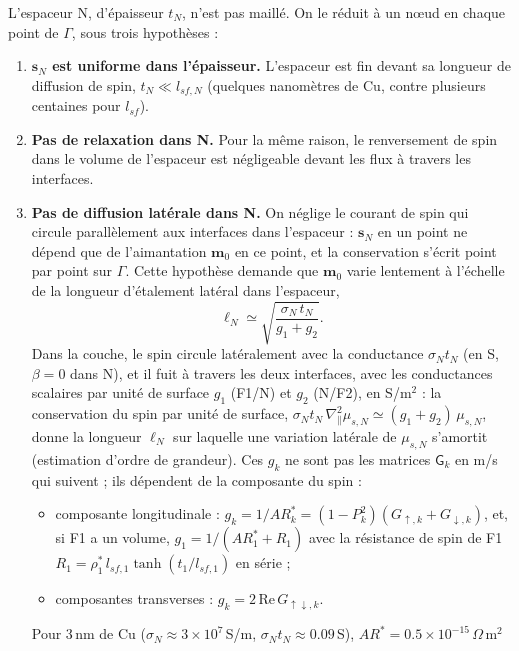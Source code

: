 \documentclass[11pt,a4paper]{article}
\newcommand{\vm}{\bm{m}}
\newcommand{\vs}{\bm{s}}
\newcommand{\mG}{\mathsf{G}}
\begin{document}
L'espaceur N, d'épaisseur $t_N$, n'est pas maillé. On le réduit à un nœud
en chaque point de $\Gamma$, sous trois hypothèses :
\begin{enumerate}
  \item \textbf{$\vs_N$ est uniforme dans l'épaisseur.} L'espaceur est fin
    devant sa longueur de diffusion de spin, $t_N\ll l_{sf,N}$ (quelques
    nanomètres de Cu, contre plusieurs centaines pour $l_{sf}$).
  \item \textbf{Pas de relaxation dans N.} Pour la même raison, le
    renversement de spin dans le volume de l'espaceur est négligeable
    devant les flux à travers les interfaces.
  \item \textbf{Pas de diffusion latérale dans N.} On néglige le courant de
    spin qui circule parallèlement aux interfaces dans l'espaceur : $\vs_N$
    en un point ne dépend que de l'aimantation $\vm_0$ en ce point, et la
    conservation s'écrit point par point sur $\Gamma$. Cette hypothèse
    demande que $\vm_0$ varie lentement à l'échelle de la longueur
    d'étalement latéral dans l'espaceur,
    \begin{equation}
      \ell_N \simeq \sqrt{\frac{\sigma_N\,t_N}{g_1+g_2}} .
    \end{equation}
    Dans la couche, le spin circule latéralement avec la conductance
    $\sigma_N t_N$ (en S, $\beta = 0$ dans N), et il fuit à travers les
    deux interfaces, avec les conductances scalaires par unité de surface
    $g_1$ (F1/N) et $g_2$ (N/F2), en S/m$^2$ : la conservation du spin par
    unité de surface, $\sigma_N t_N\,\nabla_\parallel^2\mu_{s,N}\simeq
    (g_1+g_2)\,\mu_{s,N}$, donne la longueur $\ell_N$ sur laquelle une
    variation latérale de $\mu_{s,N}$ s'amortit (estimation d'ordre de
    grandeur). Ces $g_k$ ne sont pas les matrices $\mG_k$ en m/s qui
    suivent ; ils dépendent de la composante du spin :
    \begin{itemize}
      \item composante longitudinale :
        $g_k = 1/AR_k^* = (1-P_k^2)(G_{\uparrow,k}+G_{\downarrow,k})$,
        et, si F1 a un volume, $g_1 = 1/(AR_1^* + R_1)$ avec la résistance
        de spin de F1 $R_1 = \rho_1^*\,l_{sf,1}\tanh(t_1/l_{sf,1})$ en
        série ;
      \item composantes transverses : $g_k = 2\,\mathrm{Re}\,G_{\uparrow\downarrow,k}$.
    \end{itemize}
    Pour 3\,nm de Cu ($\sigma_N\approx3\times10^7$\,S/m,
    $\sigma_N t_N\approx0.09$\,S), $AR^* = 0.5\times10^{-15}\,\Omega\,$m$^2$

\end{enumerate}
\end{document}
